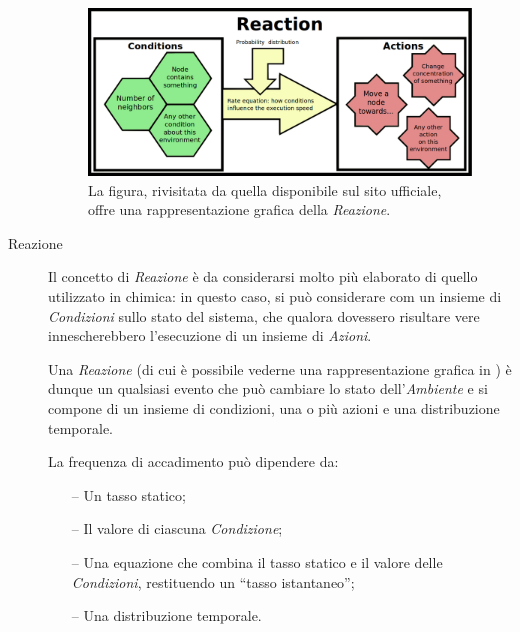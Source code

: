 \begin{description}
                    \begin{figure}[htbp]
                        \centering
                        \includegraphics[scale=.35]{img/reaction}
                        \caption{%
                            La figura, rivisitata da quella disponibile sul sito ufficiale, offre una rappresentazione grafica della \emph{Reazione}.
                        }
                        \label{fig:react}
                    \end{figure}

                \item[Reazione]\label{itm:react}
                    Il concetto di \emph{Reazione} è da considerarsi molto più elaborato di quello utilizzato in chimica: in questo caso, si può considerare com un insieme di \emph{Condizioni} sullo stato del sistema, che qualora dovessero risultare vere innescherebbero l'esecuzione di un insieme di \emph{Azioni}.

                    Una \emph{Reazione} (di cui è possibile vederne una rappresentazione grafica in ) è dunque un qualsiasi evento che può cambiare lo stato dell’\emph{Ambiente} e si compone di un insieme di condizioni, una o più azioni e una distribuzione temporale.

                    La frequenza di accadimento può dipendere da:
                    \begin{itemize}
                        \item[--] Un tasso statico;
                        \item[--] Il valore di ciascuna \emph{Condizione};
                        \item[--] Una equazione che combina il tasso statico e il valore delle \emph{Condizioni}, restituendo un ``tasso istantaneo'';
                        \item[--] Una distribuzione temporale.
                    \end{itemize}


\end{description}
